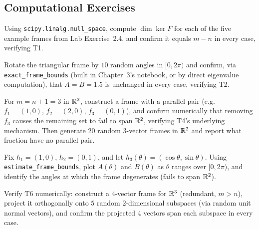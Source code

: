\subsection*{Computational Exercises}
\begin{compexercises}
	\item Using \texttt{scipy.linalg.null\_space}, compute $\dim\ker F$ for
	each of the five example frames from Lab Exercise~2.4, and confirm
	it equals $m-n$ in every case, verifying T1.
	
	\item Rotate the triangular frame by $10$ random angles in $[0,2\pi)$
	and confirm, via \texttt{exact\_frame\_bounds} (built in
	Chapter~3's notebook, or by direct eigenvalue computation), that
	$A=B=1.5$ is unchanged in every case, verifying T2.
	
	\item For $m=n+1=3$ in $\mathbb{R}^2$, construct a frame with a parallel pair
	(e.g.\ $f_1=(1,0)$, $f_2=(2,0)$, $f_3=(0,1)$), and confirm
	numerically that removing $f_3$ causes the remaining set to fail
	to span $\mathbb{R}^2$, verifying T4's underlying mechanism. Then generate
	$20$ random $3$-vector frames in $\mathbb{R}^2$ and report what fraction
	have no parallel pair.
	
	\item Fix $h_1=(1,0)$, $h_2=(0,1)$, and let $h_3(\theta)=
	(\cos\theta,\sin\theta)$. Using \texttt{estimate\_frame\_bounds},
	plot $A(\theta)$ and $B(\theta)$ as $\theta$ ranges over
	$[0,2\pi)$, and identify the angles at which the frame degenerates
	(fails to span $\mathbb{R}^2$).
	
	\item Verify T6 numerically: construct a $4$-vector frame for $\mathbb{R}^3$
	(redundant, $m>n$), project it orthogonally onto $5$ random
	$2$-dimensional subspaces (via random unit normal vectors), and
	confirm the projected $4$ vectors span each subspace in every
	case.
\end{compexercises}
